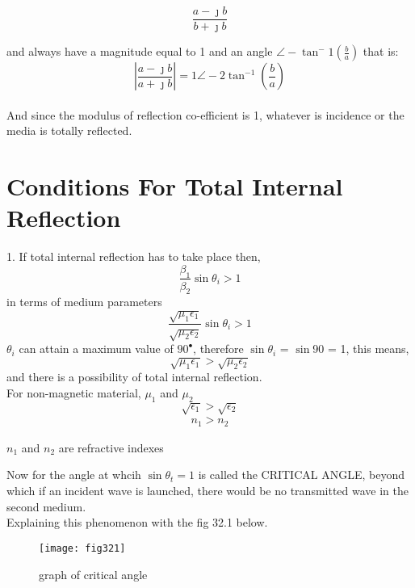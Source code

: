 \begin{equation}
\frac{a - \jmath b}{b + \jmath b}
\end{equation}

and always have a magnitude equal  to 1 and an angle $\angle-\tan^-1(\frac{b}{a})$ that is:
\begin{equation}
|\frac{a - \jmath b}{a + \jmath b}| = 1\angle - 2\tan^{-1}(\frac{b}{a})
\end{equation} \\
And since the modulus of reflection co-efficient is 1, whatever is incidence or the media is totally reflected.

\section{Conditions For Total Internal Reflection}
1. If total internal reflection has to take place then,
\begin{equation*}
\frac{\beta_1}{\beta_2}\sin\theta_i > 1
\end{equation*}
in terms of medium parameters
\begin{equation*}
\frac{\sqrt{\mu_1\epsilon_1}}{\sqrt{\mu_2\epsilon_2}}\sin\theta_i > 1
\end{equation*}
$\theta_i$ can attain a maximum value of $90^\bullet$, therefore $\sin\theta_i$ = $\sin$90 = 1, this means,
\begin{equation}
\sqrt{\mu_1\epsilon_1} > \sqrt{\mu_2\epsilon_2}
\end{equation}
and there is a possibility of total internal reflection.\\
For non-magnetic material, $\mu_1$ and $\mu_2$
\begin{equation*}
\sqrt{\epsilon_1} > \sqrt{\epsilon_2}
\end{equation*}
\begin{align*}
n_1 > n_2
\end{align*} \begin{center}
$n_1$ and $n_2$ are refractive indexes
\end{center} 
Now for the angle at whcih $\sin\theta_t = 1$ is called the CRITICAL ANGLE, beyond which if an incident wave is launched, there would be no transmitted wave in the second medium.\\
Explaining this phenomenon with the fig 32.1 below.
\begin{figure}[h]
	\centering
	\texttt{[image: fig321]}
	\caption{graph of critical angle}
\end{figure}\
